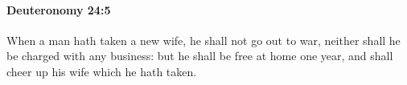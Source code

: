 
		\paragraph{Deuteronomy 24:5} %
			\label{DEUTERONOMY-24-5}

			When a man hath taken a new wife, he shall not go out to war, neither shall he be charged with any business: but he shall be free at home one year, and shall cheer up his wife which he hath taken.


